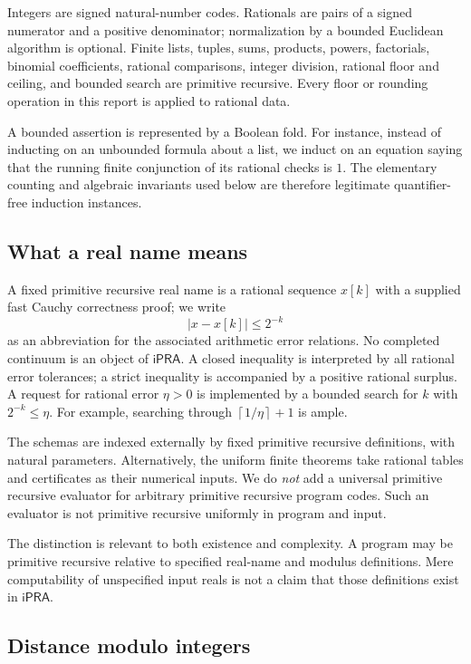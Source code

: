 \documentclass[11pt]{article}
\theoremstyle{definition}\newtheorem{definition}[theorem]{Definition}
\theoremstyle{remark}\newtheorem{remark}[theorem]{Remark}
\newcommand{\ipra}{\mathsf{iPRA}}\newcommand{\HA}{\mathsf{HA}}
\newcommand{\ceil}[1]{\left\lceil#1\right\rceil}
\begin{document}
Integers are signed natural-number codes. Rationals are pairs of a signed numerator and a positive denominator; normalization by a bounded Euclidean algorithm is optional. Finite lists, tuples, sums, products, powers, factorials, binomial coefficients, rational comparisons, integer division, rational floor and ceiling, and bounded search are primitive recursive. Every floor or rounding operation in this report is applied to rational data.

A bounded assertion is represented by a Boolean fold. For instance, instead of inducting on an unbounded formula about a list, we induct on an equation saying that the running finite conjunction of its rational checks is $1$. The elementary counting and algebraic invariants used below are therefore legitimate quantifier-free induction instances.

\subsection{What a real name means}

A fixed primitive recursive real name is a rational sequence $x[k]$ with a supplied fast Cauchy correctness proof; we write
\[
 |x-x[k]|\le2^{-k}
\]
as an abbreviation for the associated arithmetic error relations. No completed continuum is an object of $\ipra$. A closed inequality is interpreted by all rational error tolerances; a strict inequality is accompanied by a positive rational surplus. A request for rational error $\eta>0$ is implemented by a bounded search for $k$ with $2^{-k}\le\eta$. For example, searching through $\ceil{1/\eta}+1$ is ample.

The schemas are indexed externally by fixed primitive recursive definitions, with natural parameters. Alternatively, the uniform finite theorems take rational tables and certificates as their numerical inputs. We do \emph{not} add a universal primitive recursive evaluator for arbitrary primitive recursive program codes. Such an evaluator is not primitive recursive uniformly in program and input.

The distinction is relevant to both existence and complexity. A program may be primitive recursive relative to specified real-name and modulus definitions. Mere computability of unspecified input reals is not a claim that those definitions exist in $\ipra$.

\subsection{Distance modulo integers}
\end{document}

